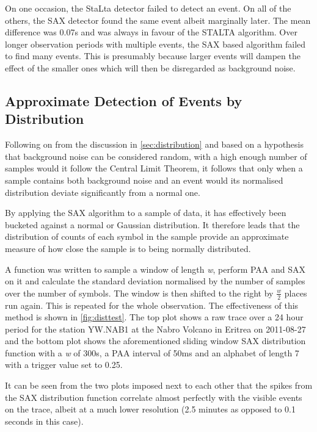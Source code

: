 \documentclass[../report.tex]{subfiles}
\begin{document}
	On one occasion, the StaLta detector failed to detect an event.  On all of the others, the SAX detector found the same event albeit marginally later.  The mean difference was 0.07s and was always in favour of the STALTA algorithm.  Over longer observation periods with multiple events, the SAX based algorithm failed to find many events.  This is presumably because larger events will dampen the effect of the smaller ones which will then be disregarded as background noise.

\subsection{Approximate Detection of Events by Distribution}

	Following on from the discussion in \cref{sec:distribution} and based on a hypothesis that background noise can be considered random, with a high enough number of samples would it follow the Central Limit Theorem, it follows that only when a sample contains both background noise and an event would its normalised distribution deviate significantly from a normal one.
	
	By applying the SAX algorithm to a sample of data, it has effectively been bucketed against a normal or Gaussian distribution.  It therefore leads that the distribution of counts of each symbol in the sample provide an approximate measure of how close the sample is to being normally distributed.
	
	A function was written to sample a window of length \textit{w}, perform PAA and SAX on it and calculate the standard deviation normalised by the number of samples over the number of symbols.  The window is then shifted to the right by $\frac{w}{2}$ places run again.  This is repeated for the whole observation.  The effectiveness of this method is shown in \cref{fig:disttest}.  The top plot shows a raw trace over a 24 hour period for the station YW.NAB1 at the Nabro Volcano in Eritrea on 2011-08-27 \citep{eritrea1} and the bottom plot shows the aforementioned sliding window SAX distribution function with a \textit{w} of 300s, a PAA interval of 50ms and an alphabet of length 7 with a trigger value set to 0.25.
	
	It can be seen from the two plots imposed next to each other that the spikes from the SAX distribution function correlate almost perfectly with the visible events on the trace, albeit at a much lower resolution (2.5 minutes as opposed to 0.1 seconds in this case).
	
\end{document}
